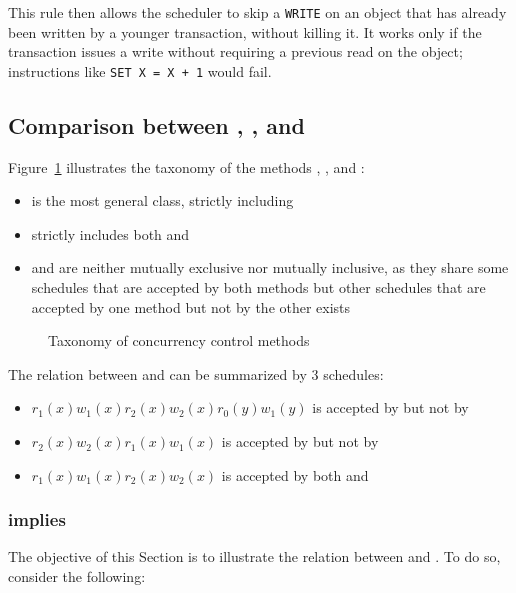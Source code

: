 \documentclass[english]{article}
\begin{document}
This rule then allows the scheduler to skip a \texttt{WRITE} on an object that has already been written by a younger transaction, without killing it.
It works only if the transaction issues a write without requiring a previous read on the object;
instructions like \texttt{SET X = X + 1} would fail.

\subsection{Comparison between \VSR, \CSR, \TPL and \TS}

Figure~\ref{fig:concurrency-control-comparison} illustrates the taxonomy of the methods \VSR, \CSR, \TPL and \TS:

\begin{itemize}
  \item \VSR is the most general class, strictly including \CSR
  \item \CSR strictly includes both \TPL and \TS
  \item \TPL and \TS are neither mutually exclusive nor mutually inclusive, as they share some schedules that are accepted by both methods but other schedules that are accepted by one method but not by the other exists
\end{itemize}

\begin{figure}[htbp]
  \centering
  \bigskip
  \caption{Taxonomy of concurrency control methods}
  \label{fig:concurrency-control-comparison}
  \bigskip
\end{figure}

\bigskip
The relation between \TS and \TPL can be summarized by \(3\) schedules:

\begin{itemize}
  \item \(r_1(x) w_1(x) r_2(x) w_2(x) r_0(y) w_1(y)\) is accepted by \TS but not by \TPL
  \item \(r_2(x) w_2(x) r_1(x) w_1(x)\) is accepted by \TPL but not by \TS
  \item \(r_1(x) w_1(x) r_2(x) w_2(x)\) is accepted by both \TS and \TPL
\end{itemize}

\subsubsection{\TS implies \CSR}

The objective of this Section is to illustrate the relation between \TS and \CSR.
To do so, consider the following:
\end{document}
